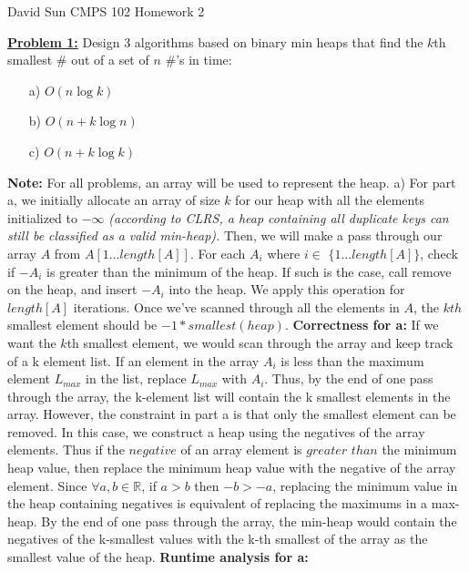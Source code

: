 \documentclass[11pt]{article}
\begin{document}
	\begin{flushleft}
		David Sun	\newline
		CMPS 102	\newline
		Homework 2	\newline
		\item \textbf {\underline{Problem 1:}} Design 3 algorithms based on binary min heaps that find the $k$th smallest \# out of a set of $n$ \#'s in time:
		\begin{enumerate}
			\item[a)] $O(n \log k)$
			\item[b)] $O(n + k \log n)$
			\item[c)] $O(n + k \log k)$
		\end{enumerate}
		\textbf{Note:} For all problems, an array will be used to represent the heap. \newline
		\newline
		a) For part a, we initially allocate an array of size $k$ for our heap with all the elements initialized to $-\infty$ \emph{(according to CLRS, a heap containing all duplicate keys can still be classified as a valid min-heap).}
		Then, we will make a pass through our array $A$ from $A[1 \dots length[A]]$. For each $A_i$ where $i \in$ $\lbrace 1 \dots length[A] \rbrace$, check if $-A_i$ is greater than the minimum of the heap. If such is the case, call remove on the heap, and insert $-A_i$ into the heap. We apply this operation for $length[A]$ iterations. Once we've scanned through all the elements in $A$, the $kth$ smallest element should be $-1 * smallest(heap)$.
		\newline
		\textbf{Correctness for a:} If we want the $k$th smallest element, we would scan through the array and keep track of a k element list. If an element in the array $A_i$ is less than the maximum element $L_{max}$ in the list, replace $L_{max}$ with $A_i$. Thus, by the end of one pass through the array, the k-element list will contain the k smallest elements in the array. However, the constraint in part a is that only the smallest element can be removed. In this case, we construct a heap using the negatives of the array elements. Thus if the $negative$ of an array element is $greater$ $than$ the minimum heap value, then replace the minimum heap value with the negative of the array element. Since $\forall a, b \in \mathbb{R}$, if $a > b$ then $-b > -a$, replacing the minimum value in the heap containing negatives is equivalent of replacing the maximums in a max-heap. By the end of one pass through the array, the min-heap would contain the negatives of the k-smallest values with the k-th smallest of the array as the smallest value of the heap.
	\textbf{Runtime analysis for a:}
	\end{flushleft}
\end{document}
